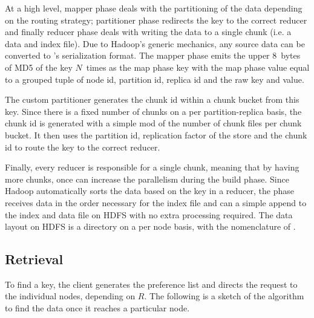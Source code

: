 At a high level, mapper phase deals with the partitioning of the data depending on the routing
strategy; partitioner phase redirects the key to the correct reducer 
and finally reducer phase deals with writing the data to a single
chunk (i.e. a data and index file). Due to Hadoop's generic 
 mechanics, any source data can be converted to 
\projectname{}'s serialization format. The mapper
phase emits the upper 8~bytes of MD5 of the \projectname{} key
$N$~times as the map phase key with the map phase value equal to a
grouped tuple of node id, partition id, replica id and the raw
\projectname{} key and value. 

The custom partitioner generates the chunk id within a chunk
bucket from this key. Since there is a fixed number of chunks on a 
per partition-replica basis, the chunk id is generated with a 
simple mod of the number of chunk files per chunk bucket. 
It then uses the partition id, replication factor of the store and 
the chunk id to route the key to the correct reducer. 

Finally, every reducer is responsible for a single chunk, 
meaning that by having more chunks, once can increase
the parallelism during the build phase. Since Hadoop automatically
sorts the data based on the key in a reducer, the phase receives data in the
order necessary for the index file and can a simple append 
to the index and data file on HDFS with no extra processing required.
The data layout on HDFS is a directory on a per \projectname{} node
basis, with the nomenclature of .


\subsection{Retrieval}
\label{sec:read_only:search}

To find a key, the client generates the preference list and directs
the request to the individual nodes, depending on $R$. 
The following is a sketch of the algorithm to find the data once it
reaches a particular node.

